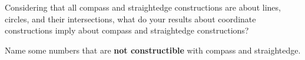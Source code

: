 \begin{prob}
Considering that all compass and straightedge constructions are about lines, circles, and their intersections, what do your results about coordinate constructions imply about compass and straightedge constructions?  
\end{prob}

\begin{prob}
Name some numbers that are \textbf{not constructible} with compass and straightedge.  
\end{prob}
